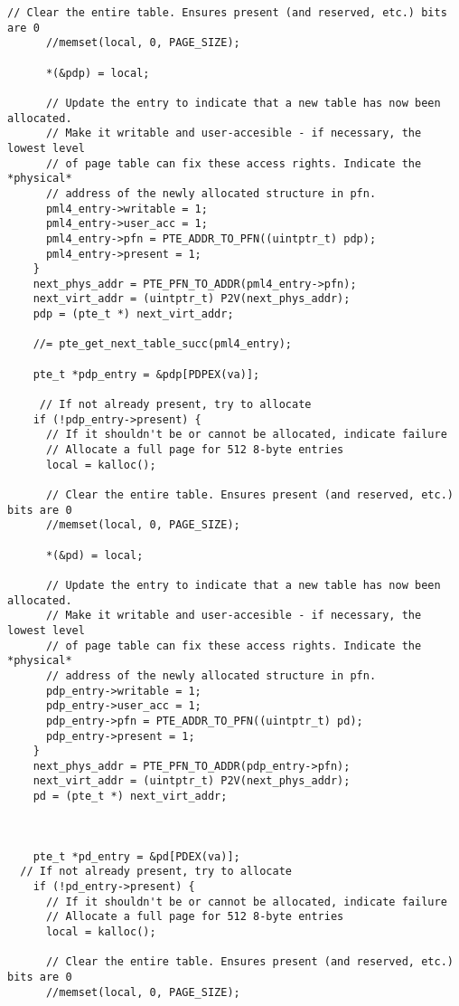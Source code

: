 \begin{lstlisting}[caption={Page-Table-Entry Library for Page-Table Traversal},label={cpagetablewalk},style=CStyle]
      // Clear the entire table. Ensures present (and reserved, etc.) bits are 0
      //memset(local, 0, PAGE_SIZE);
      
      *(&pdp) = local;

      // Update the entry to indicate that a new table has now been allocated.
      // Make it writable and user-accesible - if necessary, the lowest level
      // of page table can fix these access rights. Indicate the *physical*
      // address of the newly allocated structure in pfn.
      pml4_entry->writable = 1;
      pml4_entry->user_acc = 1;
      pml4_entry->pfn = PTE_ADDR_TO_PFN((uintptr_t) pdp);
      pml4_entry->present = 1;
    }
    next_phys_addr = PTE_PFN_TO_ADDR(pml4_entry->pfn);
    next_virt_addr = (uintptr_t) P2V(next_phys_addr);
    pdp = (pte_t *) next_virt_addr;

    //= pte_get_next_table_succ(pml4_entry);

    pte_t *pdp_entry = &pdp[PDPEX(va)];

     // If not already present, try to allocate
    if (!pdp_entry->present) {
      // If it shouldn't be or cannot be allocated, indicate failure
      // Allocate a full page for 512 8-byte entries
      local = kalloc();
   
      // Clear the entire table. Ensures present (and reserved, etc.) bits are 0
      //memset(local, 0, PAGE_SIZE);
      
      *(&pd) = local;

      // Update the entry to indicate that a new table has now been allocated.
      // Make it writable and user-accesible - if necessary, the lowest level
      // of page table can fix these access rights. Indicate the *physical*
      // address of the newly allocated structure in pfn.
      pdp_entry->writable = 1;
      pdp_entry->user_acc = 1;
      pdp_entry->pfn = PTE_ADDR_TO_PFN((uintptr_t) pd);
      pdp_entry->present = 1;
    }
    next_phys_addr = PTE_PFN_TO_ADDR(pdp_entry->pfn);
    next_virt_addr = (uintptr_t) P2V(next_phys_addr);
    pd = (pte_t *) next_virt_addr;
    
   

    pte_t *pd_entry = &pd[PDEX(va)];
  // If not already present, try to allocate
    if (!pd_entry->present) {
      // If it shouldn't be or cannot be allocated, indicate failure
      // Allocate a full page for 512 8-byte entries
      local = kalloc();
   
      // Clear the entire table. Ensures present (and reserved, etc.) bits are 0
      //memset(local, 0, PAGE_SIZE);
      

\end{lstlisting}
